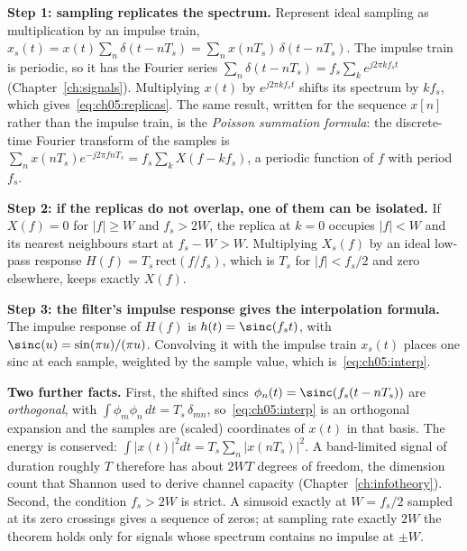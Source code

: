 \begin{deeper}
\textbf{Step 1: sampling replicates the spectrum.} Represent ideal sampling as
multiplication by an impulse train, $x_s(t)=x(t)\sum_n\delta(t-nT_s)=\sum_n x(nT_s)\,
\delta(t-nT_s)$. The impulse train is periodic, so it has the Fourier series
$\sum_n\delta(t-nT_s)=f_s\sum_k e^{j2\pi kf_st}$ (Chapter~\ref{ch:signals}). Multiplying $x(t)$
by $e^{j2\pi kf_st}$ shifts its spectrum by $kf_s$, which gives~\eqref{eq:ch05:replicas}. The same
result, written for the sequence $x[n]$ rather than the impulse train, is the \emph{Poisson
summation formula}: the discrete-time Fourier transform of the samples is
$\sum_nx(nT_s)e^{-j2\pi fnT_s}=f_s\sum_kX(f-kf_s)$, a periodic function of $f$ with period $f_s$.

\smallskip
\textbf{Step 2: if the replicas do not overlap, one of them can be isolated.} If
$X(f)=0$ for $|f|\ge W$ and $f_s>2W$, the replica at $k=0$ occupies $|f|<W$ and its nearest
neighbours start at $f_s-W>W$. Multiplying $X_s(f)$ by an ideal low-pass response
$H(f)=T_s\,\mathrm{rect}(f/f_s)$, which is $T_s$ for $|f|<f_s/2$ and zero elsewhere, keeps
exactly $X(f)$.

\smallskip
\textbf{Step 3: the filter's impulse response gives the interpolation formula.} The
impulse response of $H(f)$ is $h(t)=\sinc(f_st)$, with $\sinc(u)=\sin(\pi u)/(\pi u)$.
Convolving it with the impulse train $x_s(t)$ places one sinc at each sample, weighted by the
sample value, which is~\eqref{eq:ch05:interp}.

\smallskip
\textbf{Two further facts.} First, the shifted sincs $\phi_n(t)=\sinc(f_s(t-nT_s))$
are \emph{orthogonal}, with $\int\phi_m\phi_n\,dt=T_s\,\delta_{mn}$, so~\eqref{eq:ch05:interp} is
an orthogonal expansion and the samples are (scaled) coordinates of $x(t)$ in that basis. The
energy is conserved: $\int|x(t)|^2dt=T_s\sum_n|x(nT_s)|^2$. A band-limited signal of duration
roughly $T$ therefore has about $2WT$ degrees of freedom, the dimension count that Shannon
used to derive channel capacity (Chapter~\ref{ch:infotheory}). Second, the condition
$f_s>2W$ is strict. A sinusoid exactly at $W=f_s/2$ sampled at its zero crossings gives a
sequence of zeros; at sampling rate exactly $2W$ the theorem holds only for signals whose
spectrum contains no impulse at $\pm W$.
\end{deeper}


